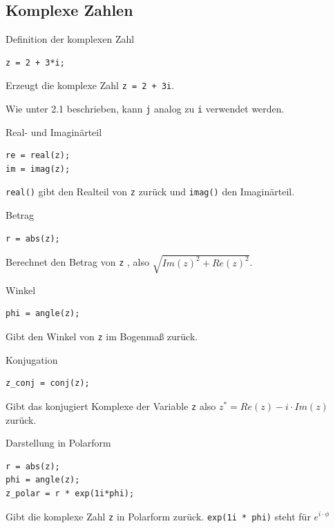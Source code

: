 \documentclass[12pt, a4paper, twoside]{article}
\begin{document}
        \subsection{Komplexe Zahlen}
        \begin{CodeErklaerungBox}{Definition der komplexen Zahl}
                \begin{lstlisting}
z = 2 + 3*i;
                \end{lstlisting}
                \tcblower
                Erzeugt die komplexe Zahl \texttt{z = 2 + 3i}. 
                \end{CodeErklaerungBox}
                \noindent Wie unter 2.1 beschrieben, kann \texttt{j} analog zu \texttt{i} verwendet werden.
                \begin{CodeErklaerungBox}{Real- und Imaginärteil}
                \begin{lstlisting}
re = real(z);
im = imag(z);
                \end{lstlisting}
                \tcblower
                \texttt{real()} gibt den Realteil von \texttt{z} zurück und \texttt{imag()} den Imaginärteil.
                \end{CodeErklaerungBox}
                \begin{CodeErklaerungBox}{Betrag}
                \begin{lstlisting}
r = abs(z);
                \end{lstlisting}
                \tcblower
                Berechnet den Betrag von \texttt{z} , also $\sqrt{Im(z)^2 + Re(z)^2}$.
                \end{CodeErklaerungBox}
                \begin{CodeErklaerungBox}{Winkel}
                \begin{lstlisting}
phi = angle(z);
                \end{lstlisting}
                \tcblower
                Gibt den Winkel von \texttt{z} im Bogenmaß zurück.
                \end{CodeErklaerungBox}
                \begin{CodeErklaerungBox}{Konjugation}
                \begin{lstlisting}
z_conj = conj(z);
                \end{lstlisting}
                \tcblower
                Gibt das konjugiert Komplexe der Variable \texttt{z} also $z^* = Re(z) - i\cdot Im(z)$ zurück.
                \end{CodeErklaerungBox}
                \begin{CodeErklaerungBox}{Darstellung in Polarform}
                \begin{lstlisting}
r = abs(z);
phi = angle(z);
z_polar = r * exp(1i*phi);
                \end{lstlisting}
                \tcblower
                Gibt die komplexe Zahl \texttt{z} in Polarform zurück. \texttt{exp(1i * phi)} steht für $e^{i \cdot \phi}$
                \end{CodeErklaerungBox}
                \newpage
\end{document}
